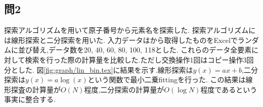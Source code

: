 \subsection*{問2}
探索アルゴリズムを用いて原子番号から元素名を探索した.
探索アルゴリズムには線形探索と二分探索を用いた.
入力データは\cite{Periodic52:online}から取得したものをExcelでランダムに並び替え,データ数を20, 40, 60, 80, 100, 118とした.
これらのデータ全要素に対して検索を行った際の計算量を比較した.ただし交換操作1回はコピー操作3回分とした.
図\ref{fig:graph/lin_bin.tex}に結果を示す.線形探索は$y(x)=ax+b$,二分探索は$y(x)=a\log(x)$という関数で最小二乗fittingを行った.
この結果は線形探査の計算量が$O(N)$程度,二分探索の計算量が$O(\log N)$程度であるという事実に整合する.
